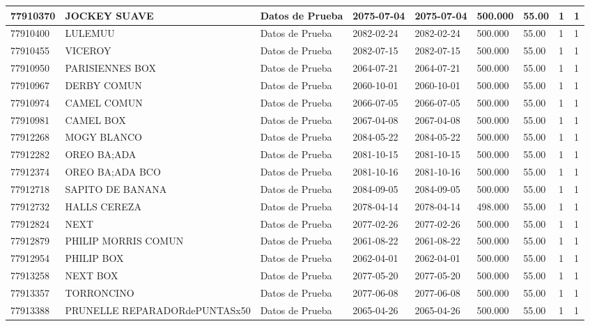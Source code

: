 \documentclass[a4paper,12pt]{article}
\begin{document}
\begin{landscape}
\begin{longtable}{|p{4cm}|p{2.5cm}|p{2.5cm}|p{1.8cm}|p{1.8cm}|p{1cm}|p{1cm}|p{3cm}|p{3cm}||}
77910370 & JOCKEY SUAVE & Datos de Prueba & 2075-07-04 & 2075-07-04 & 500.000 & 55.00 & 1 & 1 \\ \hline 
77910400 & LULEMUU & Datos de Prueba & 2082-02-24 & 2082-02-24 & 500.000 & 55.00 & 1 & 1 \\ \hline 
77910455 & VICEROY & Datos de Prueba & 2082-07-15 & 2082-07-15 & 500.000 & 55.00 & 1 & 1 \\ \hline 
77910950 & PARISIENNES BOX & Datos de Prueba & 2064-07-21 & 2064-07-21 & 500.000 & 55.00 & 1 & 1 \\ \hline 
77910967 & DERBY COMUN & Datos de Prueba & 2060-10-01 & 2060-10-01 & 500.000 & 55.00 & 1 & 1 \\ \hline 
77910974 & CAMEL COMUN & Datos de Prueba & 2066-07-05 & 2066-07-05 & 500.000 & 55.00 & 1 & 1 \\ \hline 
77910981 & CAMEL BOX & Datos de Prueba & 2067-04-08 & 2067-04-08 & 500.000 & 55.00 & 1 & 1 \\ \hline 
77912268 & MOGY BLANCO & Datos de Prueba & 2084-05-22 & 2084-05-22 & 500.000 & 55.00 & 1 & 1 \\ \hline 
77912282 & OREO BA;ADA & Datos de Prueba & 2081-10-15 & 2081-10-15 & 500.000 & 55.00 & 1 & 1 \\ \hline 
77912374 & OREO BA;ADA BCO & Datos de Prueba & 2081-10-16 & 2081-10-16 & 500.000 & 55.00 & 1 & 1 \\ \hline 
77912718 & SAPITO DE BANANA & Datos de Prueba & 2084-09-05 & 2084-09-05 & 500.000 & 55.00 & 1 & 1 \\ \hline 
77912732 & HALLS CEREZA & Datos de Prueba & 2078-04-14 & 2078-04-14 & 498.000 & 55.00 & 1 & 1 \\ \hline 
77912824 & NEXT & Datos de Prueba & 2077-02-26 & 2077-02-26 & 500.000 & 55.00 & 1 & 1 \\ \hline 
77912879 & PHILIP  MORRIS COMUN & Datos de Prueba & 2061-08-22 & 2061-08-22 & 500.000 & 55.00 & 1 & 1 \\ \hline 
77912954 & PHILIP BOX & Datos de Prueba & 2062-04-01 & 2062-04-01 & 500.000 & 55.00 & 1 & 1 \\ \hline 
77913258 & NEXT BOX & Datos de Prueba & 2077-05-20 & 2077-05-20 & 500.000 & 55.00 & 1 & 1 \\ \hline 
77913357 & TORRONCINO & Datos de Prueba & 2077-06-08 & 2077-06-08 & 500.000 & 55.00 & 1 & 1 \\ \hline 
77913388 & PRUNELLE REPARADORdePUNTASx50 & Datos de Prueba & 2065-04-26 & 2065-04-26 & 500.000 & 55.00 & 1 & 1 \\ \hline 

\end{longtable}
\end{landscape}
\end{document}
